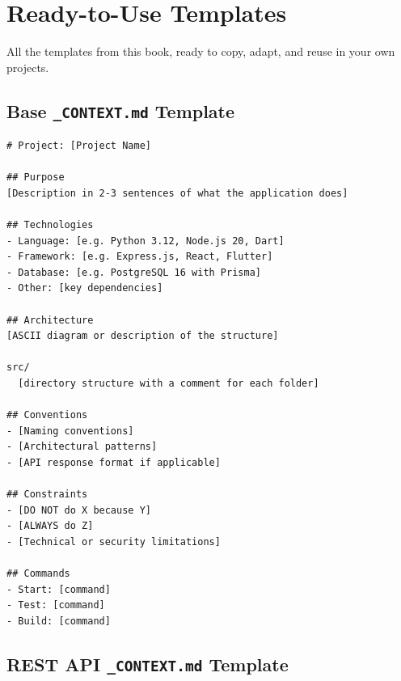 \chapter{Ready-to-Use Templates}
\label{app:templates}

All the templates from this book, ready to copy, adapt, and reuse in your own projects.

\section{Base \texttt{\_CONTEXT.md} Template}

\begin{lstlisting}[language={},title={\_CONTEXT.md --- Base template}]
# Project: [Project Name]

## Purpose
[Description in 2-3 sentences of what the application does]

## Technologies
- Language: [e.g. Python 3.12, Node.js 20, Dart]
- Framework: [e.g. Express.js, React, Flutter]
- Database: [e.g. PostgreSQL 16 with Prisma]
- Other: [key dependencies]

## Architecture
[ASCII diagram or description of the structure]

src/
  [directory structure with a comment for each folder]

## Conventions
- [Naming conventions]
- [Architectural patterns]
- [API response format if applicable]

## Constraints
- [DO NOT do X because Y]
- [ALWAYS do Z]
- [Technical or security limitations]

## Commands
- Start: [command]
- Test: [command]
- Build: [command]
\end{lstlisting}

\section{REST API \texttt{\_CONTEXT.md} Template}

